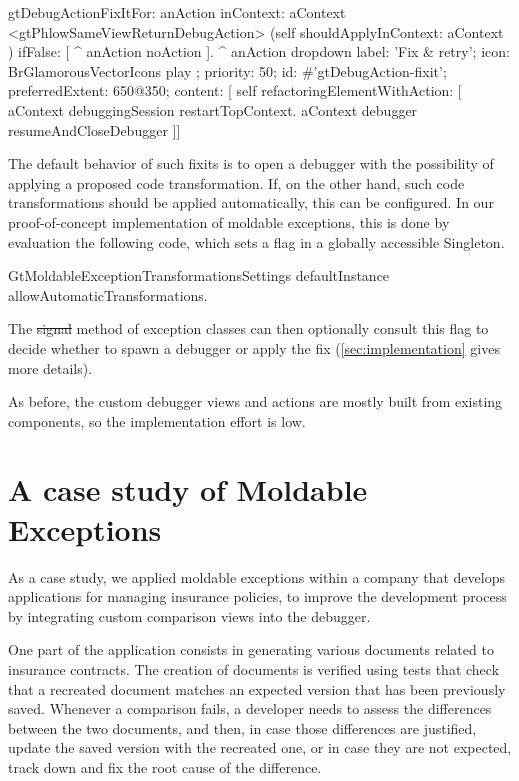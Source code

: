 \documentclass[sigplan,10pt]{acmart}
\begin{document}
\begin{code}
gtDebugActionFixItFor: anAction inContext: aContext
	<gtPhlowSameViewReturnDebugAction>
	(self shouldApplyInContext: aContext )
		ifFalse: [ ^ anAction noAction ].
	^ anAction dropdown
		label: 'Fix & retry';
		icon: BrGlamorousVectorIcons play ;
		priority: 50;
		id: #'gtDebugAction-fixit';
		preferredExtent: 650@350;
		content: [ self refactoringElementWithAction: [
			aContext debuggingSession restartTopContext.
			aContext debugger resumeAndCloseDebugger ]]
\end{code}

The default behavior of such fixits is to open a debugger with the possibility of applying a proposed code transformation.
If, on the other hand, such code transformations should be applied automatically, this can be configured.
In our proof-of-concept implementation of moldable exceptions, this is done by evaluation the following code, which sets a flag in a globally accessible Singleton.
\begin{code}
GtMoldableExceptionTransformationsSettings defaultInstance allowAutomaticTransformations.
\end{code}
The \st{signal} method of exception classes can then optionally consult this flag to decide whether to spawn a debugger or apply the fix (\autoref{sec:implementation} gives more details).

As before, the custom debugger views and actions are mostly built from existing components, so the implementation effort is low.

\section{A case study of Moldable Exceptions}\label{sec:casestudy}

As a case study, we applied moldable exceptions within a company that develops applications for managing insurance policies, to improve the development process by integrating custom comparison views into the debugger.

One part of the application consists in generating various documents related to insurance contracts.
The creation of documents is verified using tests that check that a recreated document matches an expected version that has been previously saved.
Whenever a comparison fails, a developer needs to assess the differences between the two documents, and then, in case those differences are justified, update the saved version with the recreated one, or in case they are not expected, track down and fix the root cause of the difference.
\end{document}
